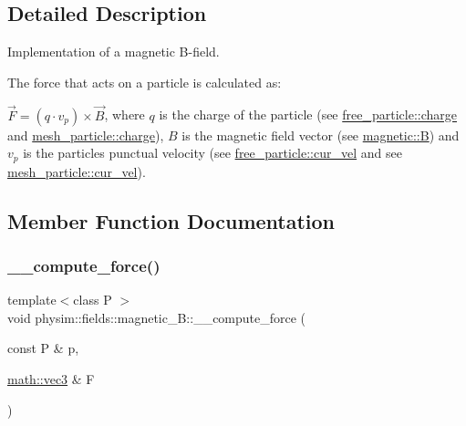 \subsection{Detailed Description}
Implementation of a magnetic B-\/field. 

The force that acts on a particle is calculated as\+:

$ \vec{F} = (q \cdot v_p) \times \vec{B}$, where $q$ is the charge of the particle (see \hyperlink{classphysim_1_1particles_1_1free__particle_a7513ac41f3cab1ce083f8695e2c73301}{free\+\_\+particle\+::charge} and \hyperlink{classphysim_1_1particles_1_1mesh__particle_adf14d64e9effa2bcf5cb84a537bd8027}{mesh\+\_\+particle\+::charge}), $B$ is the magnetic field vector (see \hyperlink{classphysim_1_1fields_1_1magnetic_a9955f0d4a3773ff96b536f37623b5ac7}{magnetic\+::B}) and $v_p$ is the particle\textquotesingle{}s punctual velocity (see \hyperlink{classphysim_1_1particles_1_1base__particle_a66a164d2a130c40901e3ec2709cdad43}{free\+\_\+particle\+::cur\+\_\+vel} and see \hyperlink{classphysim_1_1particles_1_1base__particle_a66a164d2a130c40901e3ec2709cdad43}{mesh\+\_\+particle\+::cur\+\_\+vel}). 

\subsection{Member Function Documentation}
\mbox{\label{classphysim_1_1fields_1_1magnetic__B_ad7c54b149a9a43b086dfab580129bfb2}} 
\subsubsection{\texorpdfstring{\+\_\+\+\_\+compute\+\_\+force()}{\_\_compute\_force()}}
{\footnotesize\ttfamily template$<$class P $>$ \\
void physim\+::fields\+::magnetic\+\_\+\+B\+::\+\_\+\+\_\+compute\+\_\+force (\begin{DoxyParamCaption}\item[{const P \&}]{p,  }\item[{\hyperlink{structphysim_1_1math_1_1vec3}{math\+::vec3} \&}]{F }\end{DoxyParamCaption})\hspace{0.3cm}{\ttfamily [private]}}



